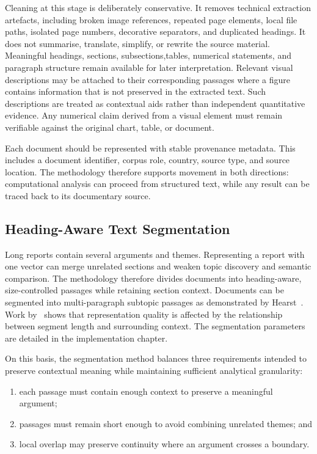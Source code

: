 Cleaning at this stage is deliberately conservative. It removes technical extraction
artefacts, including broken image references, repeated page elements, local file
paths, isolated page numbers, decorative separators, and duplicated headings. It does
not summarise, translate, simplify, or rewrite the source material. Meaningful
headings, sections, subsections,tables, numerical statements, and paragraph structure
remain available for later interpretation. Relevant visual descriptions may be
attached to their corresponding passages where a figure contains information that is
not preserved in the extracted text. Such descriptions are treated as contextual aids
rather than independent quantitative evidence. Any numerical claim derived from a
visual element must remain verifiable against the original chart, table, or document.

Each document should be represented with stable provenance metadata. This includes a
document identifier, corpus role, country, source type, and source location. The
methodology therefore supports movement in both directions: computational analysis
can proceed from structured text, while any result can be traced back to its
documentary source.

\subsection{Heading-Aware Text Segmentation}
\label{subsec:method-chunking}

Long reports contain several arguments and themes. Representing a
report with one vector can merge unrelated sections and weaken topic discovery
and semantic comparison. The methodology therefore divides documents into
heading-aware, size-controlled passages while retaining section context. Documents
can be segmented into multi-paragraph subtopic passages as demonstrated by
Hearst~\cite{hearst1997texttiling}. Work by~\cite{gunther2024latechunking,duarte2024lumberchunker} shows that representation quality is affected by the
relationship between segment length and surrounding context.
The segmentation parameters are detailed in the implementation
chapter.

On this basis, the segmentation method balances three requirements intended to
preserve contextual meaning while maintaining sufficient analytical granularity:

\begin{enumerate}
    \item each passage must contain enough context to preserve a meaningful argument;
    \item passages must remain short enough to avoid combining unrelated themes; and
    \item local overlap may preserve continuity where an argument crosses a boundary.
\end{enumerate}

